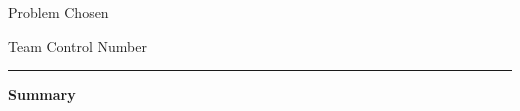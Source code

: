 \documentclass[12pt,letterpaper]{article}
\begin{document}
\thispagestyle{empty}
\noindent
\begin{minipage}[t]{0.30\textwidth}
\centering Problem Chosen\\[6pt]
{\Large\bfseries \ProblemChosen}
\end{minipage}\hfill
\begin{minipage}[t]{0.34\textwidth}
\end{minipage}\hfill
\begin{minipage}[t]{0.30\textwidth}
\centering Team Control Number\\[6pt]
{\Large\bfseries \TeamNumber}
\end{minipage}
\par\vspace{8pt}\hrule\vspace{18pt}
\begin{center}
{\Large\bfseries \PaperTitle\par}
\vspace{12pt}
{\large\bfseries Summary}
\end{center}

\vfill
\clearpage

\tableofcontents
\clearpage









\clearpage

\clearpage


% 

\clearpage

\end{document}
